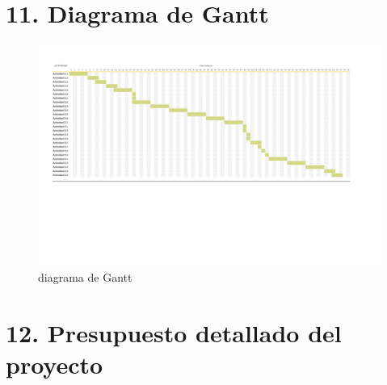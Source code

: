\documentclass[
11pt, %
codirector, %
]{charter}
\begin{document}
\begin{landscape}
	\label{sec:gantt}
	\section{11. Diagrama de Gantt}
	\begin{figure}[htpb]
		\centering
		\includegraphics[width=1.5\textheight]{./Figuras/Gantt.pdf}
		\caption{diagrama de Gantt}
		\label{fig:diagGantt}
	\end{figure}

\end{landscape}




\section{12. Presupuesto detallado del proyecto}
\label{sec:presupuesto}
\end{document}
